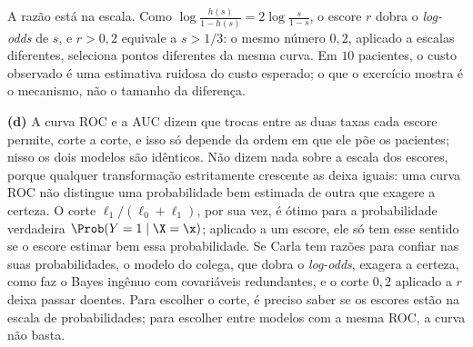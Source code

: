 \begin{solucao}
A razão está na escala. Como $\log\frac{h(s)}{1-h(s)}=2\log\frac{s}{1-s}$, o escore $r$
dobra o \emph{log-odds} de $s$, e $r>0{,}2$ equivale a $s>1/3$: o mesmo número $0{,}2$, aplicado
a escalas diferentes, seleciona pontos diferentes da mesma curva. Em $10$ pacientes, o custo
observado é uma estimativa ruidosa do custo esperado; o que o exercício mostra é o mecanismo,
não o tamanho da diferença.

\smallskip
\textbf{(d)} A curva ROC e a AUC dizem que trocas entre as duas taxas cada escore permite,
corte a corte, e isso só depende da ordem em que ele põe os pacientes; nisso os dois modelos
são idênticos. Não dizem nada sobre a escala dos escores, porque qualquer transformação
estritamente crescente as deixa iguais: uma curva ROC não distingue uma probabilidade bem
estimada de outra que exagere a certeza. O corte $\ell_1/(\ell_0+\ell_1)$, por sua vez, é ótimo para a
probabilidade verdadeira $\Prob(Y=1\mid\X=\x)$; aplicado a um escore, ele só tem esse sentido
se o escore estimar bem essa probabilidade. Se Carla tem razões para confiar nas suas
probabilidades, o modelo do colega, que dobra o \emph{log-odds}, exagera a certeza, como faz o
Bayes ingênuo com covariáveis redundantes, e o corte $0{,}2$ aplicado a $r$ deixa passar
doentes. Para escolher o corte, é preciso saber se os escores estão na escala de
probabilidades; para escolher entre modelos com a mesma ROC, a curva não basta.
\end{solucao}
